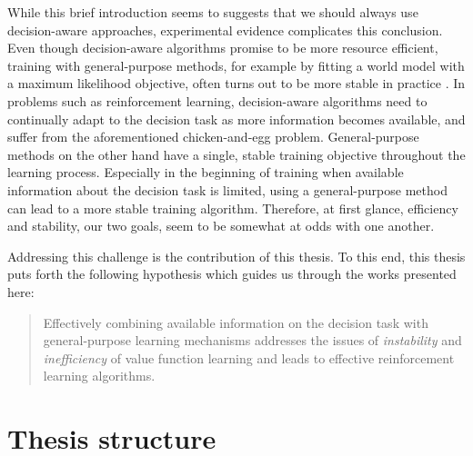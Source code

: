 While this brief introduction seems to suggests that we should always use decision-aware approaches, experimental evidence complicates this conclusion.
Even though decision-aware algorithms promise to be more resource efficient, training with general-purpose methods, for example by fitting a world model with a maximum likelihood objective, often turns out to be more stable in practice \parencite{lovatto2020decision,voelcker2022value}.
In problems such as reinforcement learning, decision-aware algorithms need to continually adapt to the decision task as more information becomes available, and suffer from the aforementioned chicken-and-egg problem.
General-purpose methods on the other hand have a single, stable training objective throughout the learning process.
Especially in the beginning of training when available information about the decision task is limited, using a general-purpose method can lead to a more stable training algorithm.
Therefore, at first glance, efficiency and stability, our two goals, seem to be somewhat at odds with one another.

Addressing this challenge is the contribution of this thesis.
To this end, this thesis puts forth the following hypothesis which guides us through the works presented here:

\begin{quote}
	Effectively combining available information on the decision task with general-purpose learning mechanisms addresses the issues of \emph{instability} and \emph{inefficiency} of value function learning and leads to effective reinforcement learning algorithms.
\end{quote}


\section{Thesis structure}

